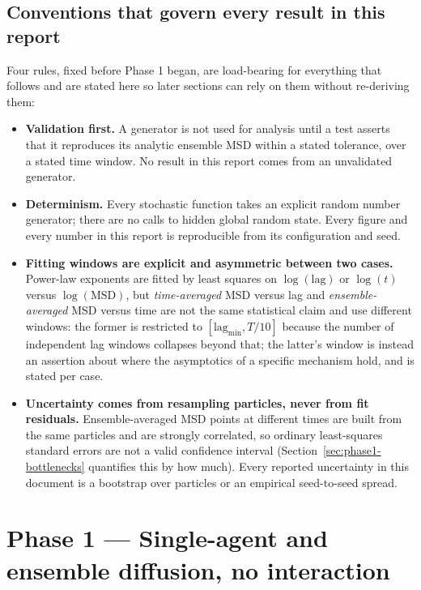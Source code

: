 \documentclass[11pt]{article}
\begin{document}
\subsection{Conventions that govern every result in this report}

Four rules, fixed before Phase 1 began, are load-bearing for everything that
follows and are stated here so later sections can rely on them without
re-deriving them:

\begin{itemize}
\item \textbf{Validation first.} A generator is not used for analysis until a
  test asserts that it reproduces its analytic ensemble MSD within a stated
  tolerance, over a stated time window. No result in this report comes from an
  unvalidated generator.
\item \textbf{Determinism.} Every stochastic function takes an explicit random
  number generator; there are no calls to hidden global random state. Every
  figure and every number in this report is reproducible from its
  configuration and seed.
\item \textbf{Fitting windows are explicit and asymmetric between two cases.}
  Power-law exponents are fitted by least squares on $\log(\mathrm{lag})$ or
  $\log(t)$ versus $\log(\mathrm{MSD})$, but \emph{time-averaged} MSD versus lag
  and \emph{ensemble-averaged} MSD versus time are not the same statistical
  claim and use different windows: the former is restricted to
  $[\mathrm{lag}_{\min}, T/10]$ because the number of independent lag windows
  collapses beyond that; the latter's window is instead an assertion about
  where the asymptotics of a specific mechanism hold, and is stated per case.
\item \textbf{Uncertainty comes from resampling particles, never from fit
  residuals.} Ensemble-averaged MSD points at different times are built from
  the same particles and are strongly correlated, so ordinary least-squares
  standard errors are not a valid confidence interval (Section~\ref{sec:phase1-bottlenecks}
  quantifies this by how much). Every reported uncertainty in this document is
  a bootstrap over particles or an empirical seed-to-seed spread.
\end{itemize}

\section{Phase 1 --- Single-agent and ensemble diffusion, no interaction}
\label{sec:phase1}
\end{document}
